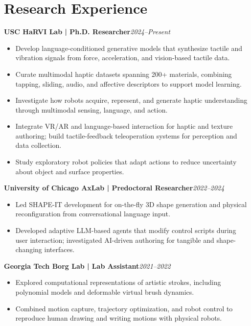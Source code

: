 \documentclass[11pt,letterpaper]{article}
\newcommand{\role}[2]{\textbf{#1}\hfill\textit{#2}\par}
\begin{document}
\section*{Research Experience}
\role{USC HaRVI Lab | Ph.D. Researcher}{2024--Present}
\begin{itemize}
\item Develop language-conditioned generative models that synthesize tactile and vibration signals from force, acceleration, and vision-based tactile data.
\item Curate multimodal haptic datasets spanning 200+ materials, combining tapping, sliding, audio, and affective descriptors to support model learning.
\item Investigate how robots acquire, represent, and generate haptic understanding through multimodal sensing, language, and action.
\item Integrate VR/AR and language-based interaction for haptic and texture authoring; build tactile-feedback teleoperation systems for perception and data collection.
\item Study exploratory robot policies that adapt actions to reduce uncertainty about object and surface properties.
\end{itemize}
\vspace{3pt}
\role{University of Chicago AxLab | Predoctoral Researcher}{2022--2024}
\begin{itemize}
\item Led SHAPE-IT development for on-the-fly 3D shape generation and physical reconfiguration from conversational language input.
\item Developed adaptive LLM-based agents that modify control scripts during user interaction; investigated AI-driven authoring for tangible and shape-changing interfaces.
\end{itemize}
\vspace{3pt}
\role{Georgia Tech Borg Lab | Lab Assistant}{2021--2022}
\begin{itemize}
\item Explored computational representations of artistic strokes, including polynomial models and deformable virtual brush dynamics.
\item Combined motion capture, trajectory optimization, and robot control to reproduce human drawing and writing motions with physical robots.
\end{itemize}
\end{document}

